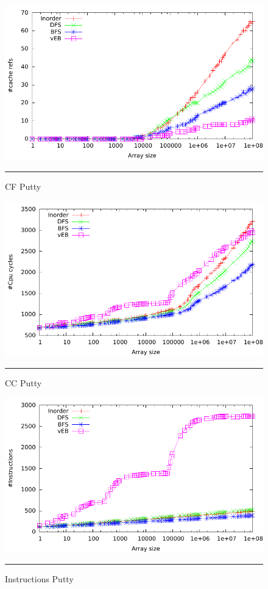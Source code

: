 \begin{figure}[htbp]
	\centering
		\includegraphics[width=\textwidth]{./Appendices/Figures/Project1/Cache_refs-Putty.pdf}
		\rule{35em}{0.5pt}
	\caption[Branch misses]{
	CF Putty
	}
	\label{fig:Cache_refs_p1putty}
\end{figure}
\begin{figure}[htbp]
	\centering
		\includegraphics[width=\textwidth]{./Appendices/Figures/Project1/Cpu_cycles-Putty.pdf}
		\rule{35em}{0.5pt}
	\caption[Cpu cycles]{
	CC Putty
	}
	\label{fig:Cpu_cycles_p1putty}
\end{figure}
\begin{figure}[htbp]
	\centering
		\includegraphics[width=\textwidth]{./Appendices/Figures/Project1/Instructions-Putty.pdf}
		\rule{35em}{0.5pt}
	\caption[Branch misses]{
	Instructions Putty
	}
	\label{fig:Instructions_p1putty}
\end{figure}

